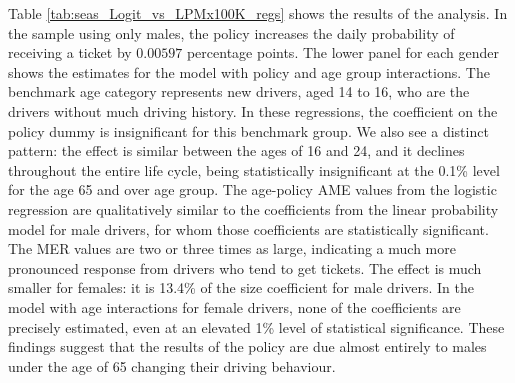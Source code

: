 Table \ref{tab:seas_Logit_vs_LPMx100K_regs} shows the results of the analysis.
In the sample using only males, 
the policy increases the daily probability of receiving a ticket by $0.00597$ 
percentage points. 
The lower panel for each gender shows the estimates for the model with 
policy and age group interactions.  
The benchmark age category represents new drivers, 
aged 14 to 16, who are the drivers without much driving history.
In these regressions,   
the coefficient on the policy dummy is insignificant for this benchmark group. 
We also see a distinct pattern: 
the effect is similar between the ages of 16 and 24, 
and it declines throughout the entire life cycle, being statistically insignificant at the 0.1\% level for the age 65 and over age group.
% 
The age-policy AME values from the logistic regression 
are qualitatively similar to the coefficients from the linear probability model for male drivers, 
for whom those coefficients are statistically significant. 
The MER values are two or three times as large, 
indicating a much more pronounced response from drivers who tend to get tickets. 
% 
The effect is much smaller for females: it is 13.4\% of the size coefficient for male drivers. 
In the model with age interactions for female drivers, 
none of the coefficients are precisely estimated, 
even at an elevated 1\% level of statistical significance. 
These findings suggest that the results of the policy are due almost entirely to males under the age of 65 changing their driving behaviour.
%

